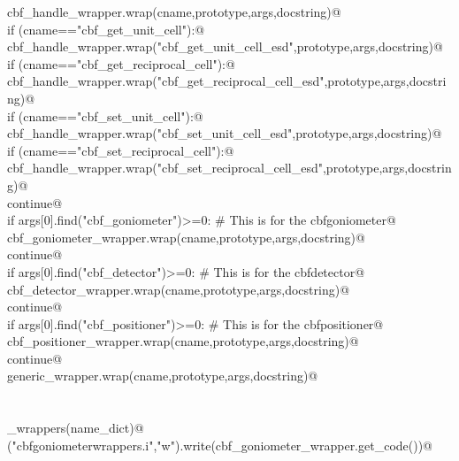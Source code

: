 \documentclass[10pt,a4paper,twoside,notitlepage]{article}
\begin{document}
\begin{flushleft}
\begin{list}{}{}
\mbox{}\verb@         cbf_handle_wrapper.wrap(cname,prototype,args,docstring)@\\
\mbox{}\verb@         if (cname=="cbf_get_unit_cell"):@\\
\mbox{}\verb@           cbf_handle_wrapper.wrap("cbf_get_unit_cell_esd",prototype,args,docstring)@\\
\mbox{}\verb@         if (cname=="cbf_get_reciprocal_cell"):@\\
\mbox{}\verb@           cbf_handle_wrapper.wrap("cbf_get_reciprocal_cell_esd",prototype,args,docstring)@\\
\mbox{}\verb@         if (cname=="cbf_set_unit_cell"):@\\
\mbox{}\verb@           cbf_handle_wrapper.wrap("cbf_set_unit_cell_esd",prototype,args,docstring)@\\
\mbox{}\verb@         if (cname=="cbf_set_reciprocal_cell"):@\\
\mbox{}\verb@           cbf_handle_wrapper.wrap("cbf_set_reciprocal_cell_esd",prototype,args,docstring)@\\
\mbox{}\verb@         continue@\\
\mbox{}\verb@      if args[0].find("cbf_goniometer")>=0: # This is for the cbfgoniometer@\\
\mbox{}\verb@         cbf_goniometer_wrapper.wrap(cname,prototype,args,docstring)@\\
\mbox{}\verb@         continue@\\
\mbox{}\verb@      if args[0].find("cbf_detector")>=0: # This is for the cbfdetector@\\
\mbox{}\verb@         cbf_detector_wrapper.wrap(cname,prototype,args,docstring)@\\
\mbox{}\verb@         continue@\\
\mbox{}\verb@      if args[0].find("cbf_positioner")>=0: # This is for the cbfpositioner@\\
\mbox{}\verb@         cbf_positioner_wrapper.wrap(cname,prototype,args,docstring)@\\
\mbox{}\verb@         continue@\\
\mbox{}\verb@      generic_wrapper.wrap(cname,prototype,args,docstring)@\\
\mbox{}\verb@@\\
\mbox{}\verb@@\\
\mbox{}\verb@generate_wrappers(name_dict)@\\
\mbox{}\verb@open("cbfgoniometerwrappers.i","w").write(cbf_goniometer_wrapper.get_code())@\\

\end{list}
\end{flushleft}
\end{document}
